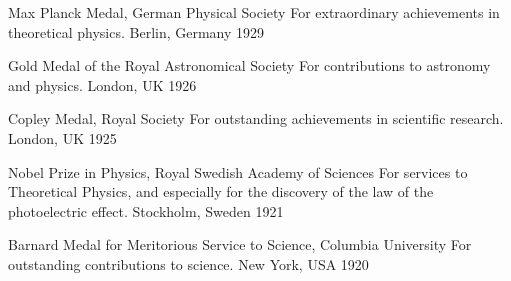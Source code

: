 

\begin{cvhonors}
    
  \cvhonor
    {Max Planck Medal, German Physical Society} %
    {For extraordinary achievements in theoretical physics.} %
    {Berlin, Germany} %
    {1929} %

    
  \cvhonor
    {Gold Medal of the Royal Astronomical Society} %
    {For contributions to astronomy and physics.} %
    {London, UK} %
    {1926} %


  \cvhonor
    {Copley Medal, Royal Society} %
    {For outstanding achievements in scientific research.} %
    {London, UK} %
    {1925} %


  \cvhonor
    {Nobel Prize in Physics, Royal Swedish Academy of Sciences} %
    {For services to Theoretical Physics, and especially
    for the discovery of the law of the photoelectric effect.} %
    {Stockholm, Sweden} %
    {1921} %

    
  \cvhonor
    {Barnard Medal for Meritorious Service to Science,
    Columbia University} %
    {For outstanding contributions to science.} %
    {New York, USA} %
    {1920} %

\end{cvhonors}

